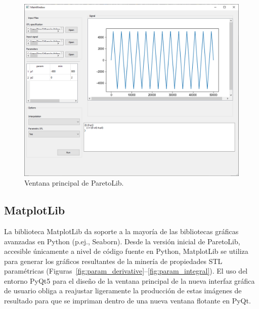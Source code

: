 \begin{figure}[htb]
\centering
  \includegraphics[width=1.0\linewidth]{images/gui} 
\caption{Ventana principal de ParetoLib.}
\label{fig:gui}
\end{figure}

 
 
 
 
\subsection{MatplotLib}
La biblioteca MatplotLib da soporte a la mayoría de las bibliotecas gráficas avanzadas en Python (p.ej., Seaborn). Desde la versión inicial de ParetoLib, accesible únicamente a nivel de código fuente en Python, MatplotLib se utiliza para generar los gráficos resultantes de la minería de propiedades STL paramétricas (Figuras~\ref{fig:param_derivative}--\ref{fig:param_integral}). El uso del entorno PyQt5 para el diseño de la ventana principal de la nueva interfaz gráfica de usuario obliga a reajustar ligeramente la producción de estas imágenes de resultado para que se impriman dentro de una nueva ventana flotante en PyQt.
 
